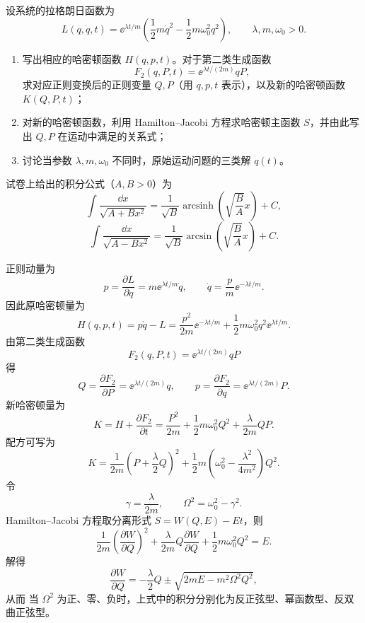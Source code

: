 
\begin{question}
设系统的拉格朗日函数为
\[
  L(q,\dot q,t)=\ee^{\lambda t/m}
  \left(\frac12m\dot q^2-\frac12m\omega_0^2q^2\right),
  \qquad \lambda,m,\omega_0>0.
\]
\begin{enumerate}
  \item 写出相应的哈密顿函数 $H(q,p,t)$。对于第二类生成函数
  \[
    F_2(q,P,t)=\ee^{\lambda t/(2m)}qP,
  \]
  求对应正则变换后的正则变量 $Q,P$（用 $q,p,t$ 表示），以及新的哈密顿函数 $K(Q,P,t)$；
  \item 对新的哈密顿函数，利用 Hamilton--Jacobi 方程求哈密顿主函数 $S$，并由此写出 $Q,P$ 在运动中满足的关系式；
  \item 讨论当参数 $\lambda,m,\omega_0$ 不同时，原始运动问题的三类解 $q(t)$。
\end{enumerate}

试卷上给出的积分公式（$A,B>0$）为
\[
  \int\frac{\dd x}{\sqrt{A+Bx^2}}
  =\frac{1}{\sqrt{B}}\operatorname{arcsinh}\left(\sqrt{\frac{B}{A}}x\right)+C,
\]
\[
  \int\frac{\dd x}{\sqrt{A-Bx^2}}
  =\frac{1}{\sqrt{B}}\arcsin\left(\sqrt{\frac{B}{A}}x\right)+C.
\]

\begin{solution}
正则动量为
\[
  p=\frac{\partial L}{\partial\dot q}=m\ee^{\lambda t/m}\dot q,
  \qquad
  \dot q=\frac{p}{m}\ee^{-\lambda t/m}.
\]
因此原哈密顿量为
\[
  H(q,p,t)=p\dot q-L
  =\frac{p^2}{2m}\ee^{-\lambda t/m}
  +\frac12m\omega_0^2q^2\ee^{\lambda t/m}.
\]
由第二类生成函数
\[
  F_2(q,P,t)=\ee^{\lambda t/(2m)}qP
\]
得
\[
  Q=\frac{\partial F_2}{\partial P}=\ee^{\lambda t/(2m)}q,
  \qquad
  p=\frac{\partial F_2}{\partial q}=\ee^{\lambda t/(2m)}P.
\]
新哈密顿量为
\[
  K=H+\frac{\partial F_2}{\partial t}
  =\frac{P^2}{2m}+\frac12m\omega_0^2Q^2+\frac{\lambda}{2m}QP.
\]
配方可写为
\[
  K=\frac{1}{2m}\left(P+\frac\lambda2Q\right)^2
  +\frac12m\left(\omega_0^2-\frac{\lambda^2}{4m^2}\right)Q^2.
\]
令
\[
  \gamma=\frac{\lambda}{2m},
  \qquad
  \Omega^2=\omega_0^2-\gamma^2.
\]
Hamilton--Jacobi 方程取分离形式 $S=W(Q,E)-Et$，则
\[
  \frac{1}{2m}\left(\frac{\partial W}{\partial Q}\right)^2
  +\frac{\lambda}{2m}Q\frac{\partial W}{\partial Q}
  +\frac12m\omega_0^2Q^2=E.
\]
解得
\[
  \frac{\partial W}{\partial Q}
  =-\frac\lambda2Q\pm\sqrt{2mE-m^2\Omega^2Q^2},
\]
从而
当 $\Omega^2$ 为正、零、负时，上式中的积分分别化为反正弦型、幂函数型、反双曲正弦型。


\end{solution}
\end{question}
